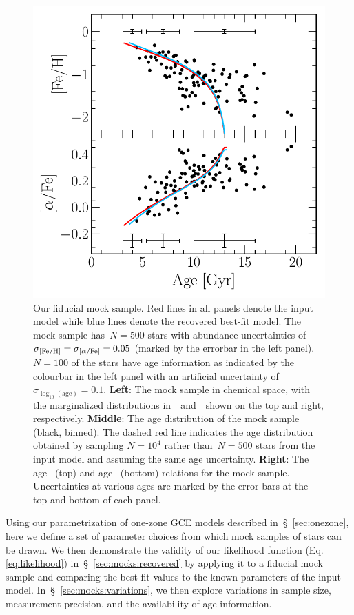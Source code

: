 \documentclass[ms.tex]{subfiles}
\begin{document}
\begin{figure}
\includegraphics[scale = 0.41]{fiducial_mock_amr.pdf}
\caption{
Our fiducial mock sample.
Red lines in all panels denote the input model while blue lines denote the
recovered best-fit model.
The mock sample has~$N = 500$ stars with abundance uncertainties of
$\sigma_{\text{[Fe/H]}} = \sigma_{\text{[$\alpha$/Fe]}} = 0.05$ (marked by the errorbar in the left panel).
$N = 100$ of the stars have age information as indicated by the colourbar in
the left panel with an artificial uncertainty
of~$\sigma_{\log_{10}(\text{age})} = 0.1$.
\textbf{Left}: The mock sample in chemical space, with the marginalized
distributions in~\feh~and~\afe~shown on the top and right, respectively.
\textbf{Middle}: The age distribution of the mock sample (black, binned).
The dashed red line indicates the age distribution obtained by sampling
$N = 10^4$ rather than~$N = 500$ stars from the input model and assuming the
same age uncertainty.
\textbf{Right}: The age-\feh~(top) and age-\afe~(bottom) relations for the mock
sample.
Uncertainties at various ages are marked by the error bars at the top and
bottom of each panel.
}
\label{fig:fiducial_mock}
\end{figure}

Using our parametrization of one-zone GCE models described
in~\S~\ref{sec:onezone}, here we define a set of parameter choices from which
mock samples of stars can be drawn.
We then demonstrate the validity of our likelihood function (Eq.
\ref{eq:likelihood}) in~\S~\ref{sec:mocks:recovered} by applying it to a
fiducial mock sample and comparing the best-fit values to the known parameters
of the input model.
In~\S~\ref{sec:mocks:variations}, we then explore variations in sample size,
measurement precision, and the availability of age information.
\end{document}

